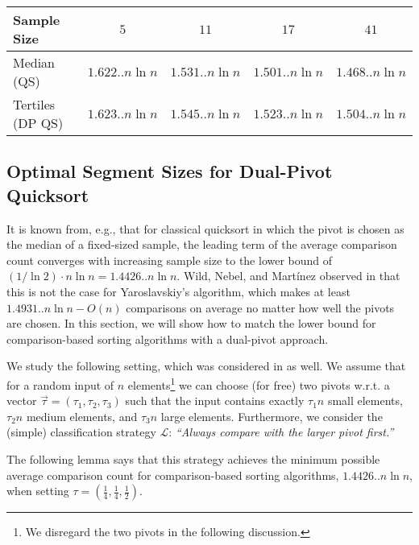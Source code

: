 \documentclass[prodmode,acmtalg]{acmsmall}
\let\accentvec\vec
\let\vec\accentvec
\begin{document}
\begin{table}
    {
    \begin{tabular}{l||c|c|c|c}
	Sample Size & $5$ & $11$ & $17$ & $41$ \\ \hline
	Median (QS) & $1.622.. n \ln n  $ & $1.531.. n \ln n $ & $1.501.. n \ln n
	    $ & $1.468.. n \ln n $ \\ \hline
        Tertiles (DP QS) & $1.623.. n \ln n $ & $1.545.. n \ln n $ & $1.523.. n \ln n
		   $ & $1.504.. n \ln n $
     \end{tabular}
     }
 \end{table}
    

\subsection{Optimal Segment Sizes for Dual-Pivot
Quicksort}\label{sec:optimal:segment:sizes}
It is known from, e.g., \cite{MartinezR01} that for classical quicksort in which the pivot is chosen as the median of a
fixed-sized sample, the leading term of the average comparison count converges with increasing sample size 
to the lower bound of
$(1/\ln 2) \cdot n \ln n = 1.4426.. n \ln n$.  
Wild, Nebel, and Mart\'inez observed in \cite{WildNM14} that this is not the case for
Yaroslavskiy's algorithm, which makes at least $1.4931.. n \ln n - O(n)$ comparisons on
average no matter how well the pivots are chosen. In this section, we will show how to match the lower
bound for comparison-based sorting algorithms with a dual-pivot approach.

We study the following setting, which was considered in \cite{MartinezR01,WildNM14}
as well. We assume that for a random input of $n$ elements\footnote{We disregard the two pivots
in the following discussion.}
we can choose (for free) two pivots w.r.t. a vector $\vec{\tau} = (\tau_1, \tau_2, \tau_3)$ 
such that the input contains exactly $\tau_1 n$ small elements, $\tau_2 n$ medium elements, and
$\tau_3 n$ large elements. Furthermore, we consider the (simple) classification
strategy $\mathcal{L}$: \emph{``Always compare with the larger pivot first.''}

The following lemma says that this strategy achieves the minimum possible
average comparison count for comparison-based sorting algorithms, $1.4426.. n
\ln n$, when setting $\tau = (\frac14,\frac14,\frac12)$. 
\end{document}
